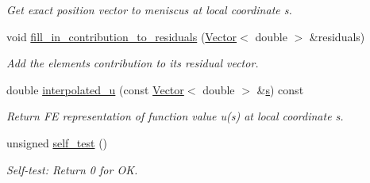 \begin{DoxyCompactItemize}
\begin{DoxyCompactList}\small\item\em Get exact position vector to meniscus at local coordinate s. \end{DoxyCompactList}\item 
void \hyperlink{classoomph_1_1YoungLaplaceEquations_aa28a2c9f2c9a41c9af5530d269d5deee}{fill\+\_\+in\+\_\+contribution\+\_\+to\+\_\+residuals} (\hyperlink{classoomph_1_1Vector}{Vector}$<$ double $>$ \&residuals)
\begin{DoxyCompactList}\small\item\em Add the element\textquotesingle{}s contribution to its residual vector. \end{DoxyCompactList}\item 
double \hyperlink{classoomph_1_1YoungLaplaceEquations_a4839156bf756602298093aa3c0a2f103}{interpolated\+\_\+u} (const \hyperlink{classoomph_1_1Vector}{Vector}$<$ double $>$ \&\hyperlink{cfortran_8h_ab7123126e4885ef647dd9c6e3807a21c}{s}) const
\begin{DoxyCompactList}\small\item\em Return FE representation of function value u(s) at local coordinate s. \end{DoxyCompactList}\item 
unsigned \hyperlink{classoomph_1_1YoungLaplaceEquations_a5856fb3002cc7e9c860331d2c8c87c10}{self\+\_\+test} ()
\begin{DoxyCompactList}\small\item\em Self-\/test\+: Return 0 for OK. \end{DoxyCompactList}\end{DoxyCompactItemize}
